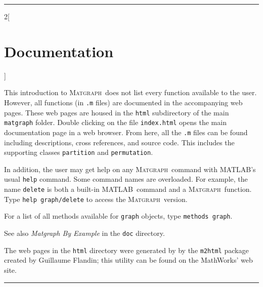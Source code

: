 \documentclass{amsart}
\newcommand\matlab{MATLAB}
\newcommand\matgraph{\textsc{Matgraph}}
\begin{document}
\hrule
\begin{multicols}{2}[\section{Documentation}]
\label{sect:documentation}

This introduction to \matgraph\ does not list every function available
to the user. However, all functions (in \verb|.m| files) are
documented in the accompanying web pages.  These web pages are housed
in the \verb|html| subdirectory of the main \verb|matgraph| folder.
Double clicking on the file \verb|index.html| opens the main
documentation page in a web browser. From here, all the \verb|.m|
files can be found including descriptions, cross references, and
source code.  This includes the supporting classes \verb|partition|
and \verb|permutation|.


In addition, the user may get help on any \matgraph\ command with
\matlab's usual \verb|help| command. Some command names are
overloaded. For example, the name \verb|delete| is both a built-in
\matlab\ command and a \matgraph\ function. Type 
\verb|help graph/delete| to access the \matgraph\ version. 

For a list of all methods available for \verb|graph| objects, type
\verb|methods graph|.

See also \emph{Matgraph By Example} in the \verb|doc| directory.

The web pages in the \verb|html| directory were generated by by the
\verb|m2html| package created by Guillaume Flandin; this utility can
be found on the MathWorks' web site.





\end{multicols}\hrule
\end{document}
